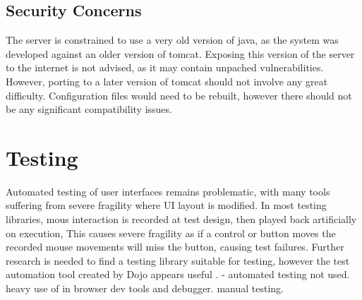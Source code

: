 \subsection{Security Concerns}
The server is constrained to use a very old version of java, as the system was developed against an older version of tomcat. Exposing this version of the server to the internet is not advised, as it may contain unpached vulnerabilities. However, porting to a later version of tomcat should not involve any great difficulty.  Configuration files would need to be rebuilt, however there should not be any significant compatibility issues.

\section{Testing}
Automated testing of user interfaces remains problematic, with many tools suffering from severe fragility where UI layout is modified. In most testing libraries, mous interaction is recorded at test design, then played back artificially on execution, This causes severe fragility as if a control or button moves the recorded mouse movements will miss the button, causing test failures. Further research is needed to find a testing library suitable for testing, however the test automation tool created by Dojo appears useful \cite{dojo2013test}. - automated testing not used. heavy use of in browser dev tools and debugger. manual testing. 